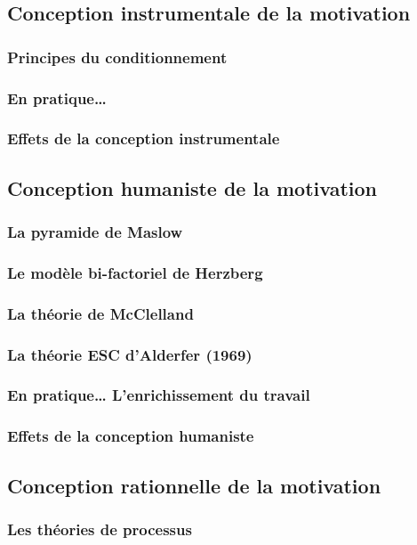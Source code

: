 \documentclass[12pt]{article}
\begin{document}
	\subsection{Conception instrumentale de la motivation}
		\subsubsection{Principes du conditionnement}
		\subsubsection{En pratique…}
		\subsubsection{Effets de la conception instrumentale}
	\subsection{Conception humaniste de la motivation}
		\subsubsection{La pyramide de Maslow}
		\subsubsection{Le modèle bi-factoriel de Herzberg}
		\subsubsection{La théorie de McClelland}
		\subsubsection{La théorie ESC d’Alderfer (1969)}
		\subsubsection{En pratique… L’enrichissement du travail}
		\subsubsection{Effets de la conception humaniste}
	\subsection{Conception rationnelle de la motivation}
		\subsubsection{Les théories de processus}
\end{document}

